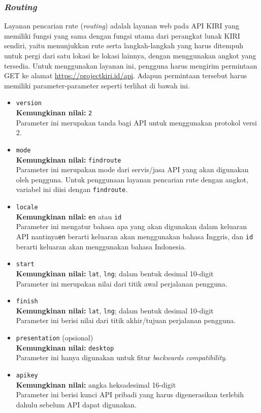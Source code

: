 \subsubsection{\textit{Routing}}
\label{sec:kiri-api-routing}

Layanan pencarian rute (\textit{routing}) adalah layanan web pada API KIRI yang memiliki fungsi yang sama dengan fungsi utama dari perangkat lunak KIRI sendiri, yaitu menunjukkan rute serta langkah-langkah yang harus ditempuh untuk pergi dari satu lokasi ke lokasi lainnya, dengan menggunakan angkot yang tersedia. Untuk menggunakan layanan ini, pengguna harus mengirim permintaan GET ke alamat \href{https://projectkiri.id/api}{https://projectkiri.id/api}. Adapun permintaan tersebut harus memiliki parameter-parameter seperti terlihat di bawah ini.
\begin{itemize}
	\item \verb|version|\\
	\textbf{Kemungkinan nilai:} \verb|2|\\
	Parameter ini merupakan tanda bagi API untuk menggunakan protokol versi 2.
	\item \verb|mode|\\
	\textbf{Kemungkinan nilai:} \verb|findroute|\\
	Parameter ini merupakan mode dari servis/jasa API yang akan digunakan oleh pengguna. Untuk penggunaan layanan pencarian rute dengan angkot, variabel ini diisi dengan \verb|findroute|.
	\item \verb|locale|\\
	\textbf{Kemungkinan nilai:} \verb|en| atau \verb|id|\\
	Parameter ini mengatur bahasa apa yang akan digunakan dalam keluaran API nantinya\textemdash\verb|en| berarti keluaran akan menggunakan bahasa Inggris, dan \verb|id| berarti keluaran akan menggunakan bahasa Indonesia.
	\item \verb|start|\\
	\textbf{Kemungkinan nilai:} \verb|lat|, \verb|lng|; dalam bentuk desimal 10-digit\\
	Parameter ini merupakan nilai \latlon\xspace dari titik awal perjalanan pengguna.
	\item \verb|finish|\\
	\textbf{Kemungkinan nilai:} \verb|lat|, \verb|lng|; dalam bentuk desimal 10-digit\\
	Parameter ini berisi nilai \latlon\xspace dari titik akhir/tujuan perjalanan pengguna.
	\item \verb|presentation| (opsional)\\
	\textbf{Kemungkinan nilai:} \verb|desktop|\\
	Parameter ini hanya digunakan untuk fitur \textit{backwards compatibility}.
	\item \verb|apikey|\\
	\textbf{Kemungkinan nilai:} angka heksadesimal 16-digit\\
	Parameter ini berisi kunci API pribadi yang harus digenerasikan terlebih dahulu sebelum API dapat digunakan.
\end{itemize}

